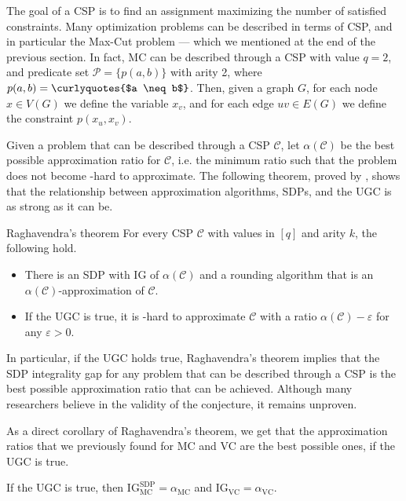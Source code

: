 \documentclass[a4paper, 12pt]{report}
\begin{document}
    The goal of a CSP is to find an assignment maximizing the number of satisfied constraints. Many optimization problems can be described in terms of CSP, and in particular the Max-Cut problem --- which we mentioned at the end of the previous section. In fact, MC can be described through a CSP with value $q = 2$, and predicate set $\mathcal P = \{p(a, b)\}$ with arity 2, where $p(a, b) = \mbox{\curlyquotes{$a \neq b$}}$. Then, given a graph $G$, for each node $x \in V(G)$ we define the variable $x_v$, and for each edge $uv \in E(G)$ we define the constraint $p(x_u, x_v)$.
    
    Given a problem that can be described through a CSP $\mathcal C$, let $\alpha(\mathcal C)$ be the best possible approximation ratio for $\mathcal C$, i.e. the minimum ratio such that the problem does not become \NPclass-hard to approximate. The following theorem, proved by \textcite{raghavendra}, shows that the relationship between approximation algorithms, SDPs, and the UGC is as strong as it can be.

    \begin{framedthm}{Raghavendra's theorem}
        For every CSP $\mathcal C$ with values in $[q]$ and arity $k$, the following hold.

        \begin{itemize}
            \item There is an SDP with IG of $\alpha(\mathcal C)$ and a rounding algorithm that is an $\alpha(\mathcal C)$-approximation of $\mathcal C$.
            \item If the UGC is true, it is \NPclass-hard to approximate $\mathcal C$ with a ratio $\alpha(\mathcal C) - \varepsilon$ for any $\varepsilon > 0$.
        \end{itemize}
    \end{framedthm}

    In particular, if the UGC holds true, Raghavendra's theorem implies that the SDP integrality gap for any problem that can be described through a CSP is the best possible approximation ratio that can be achieved. Although many researchers believe in the validity of the conjecture, it remains unproven.

    As a direct corollary of Raghavendra's theorem, we get that the approximation ratios that we previously found for MC and VC are the best possible ones, if the UGC is true.

    \begin{framedcor}{}
        If the UGC is true, then $\mathrm{IG}_{\mathrm{MC}}^{\mathrm{SDP}} = \alpha_\mathrm{MC}$ and $\mathrm{IG}_\mathrm{VC} = \alpha_\mathrm{VC}$.
    \end{framedcor}
\end{document}
